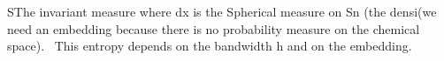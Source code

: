 SThe invariant measure where dx is the Spherical measure on Sn (the densi(we need an embedding because there is no probability measure on the chemical space). 
This entropy depends on the bandwidth h and on the embedding.
